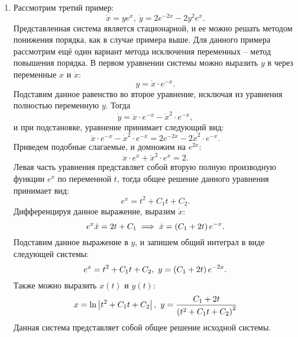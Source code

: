 \begin{enumerate}
			\item Рассмотрим третий пример:
				\[ \dot{x} = y e^{x}, ~ \dot{y} = 2e^{-2x} - 2y^2 e^{x}. \]
				Представленная система является стационарной, и ее можно решать методом понижения порядка, как в случае примера выше. Для данного примера рассмотрим ещё один вариант метода исключения переменных -- метод повышения порядка. В первом уравнении системы можно выразить $y$ в через переменные $x$ и $\dot{x}$:
				\[ y = \dot{x} \cdot e^{-x}. \]
				Подставим данное равенство во второе уравнение, исключая из уравнения полностью переменную $y$. Тогда
				\[ \dot{y} = \ddot{x} \cdot e^{-x} - \dot{x}^2 \cdot e^{-x}, \]
				и при подстановке, уравнение принимает следующий вид:
				\[ \ddot{x} \cdot e^{-x} - \dot{x}^2 \cdot e^{-x} = 2e^{-2x} -2 \dot{x}^2 \cdot e^{-x}. \]
				Приведем подобные слагаемые, и домножим на $e^{2x}$:
				\[ \ddot{x} \cdot e^{x} + \dot{x}^2 \cdot e^{x} = 2. \]
				Левая часть уравнения представляет собой вторую полную производную функции $e^x$ по переменной $t$, тогда общее решение данного уравнения принимает вид:
				\[ e^{x} = t^2 + C_1 t + C_2. \]
				Дифференцируя данное выражение, выразим $\dot{x}$:
				\[ e^{x} \dot{x} = 2t + C_1 \implies \dot{x} = \left( C_1 + 2t \right) e^{-x}. \]
				Подставим данное выражение в $y$, и запишем общий интеграл в виде следующей системы:
				\[ e^{x} = t^2 + C_1 t + C_2, ~ y = \left( C_1 + 2t \right) e^{-2x}. \]
				Также можно выразить $x(t)$ и $y(t)$:
				\[ x = \ln\left\vert t^2 + C_1 t + C_2 \right\vert, ~ y = \frac{C_1 + 2t}{\left( t^2 + C_1 t + C_2 \right)^2} \]
				Данная система представляет собой общее решение исходной системы.


\end{enumerate}

